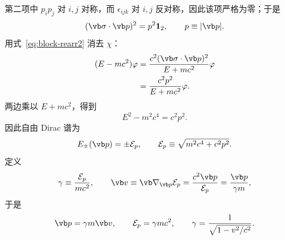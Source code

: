 第二项中 $p_ip_j$ 对 $i,j$ 对称，而 $\epsilon_{ijk}$ 对 $i,j$ 反对称，因此该项严格为零；于是
\begin{equation}
 (\vb\sigma\cdot\vb p)^2=p^2\mathbf 1_2,
 \qquad p\equiv|\vb p|.
 \label{eq:sigmap-square}
\end{equation}
用式~\cref{eq:block-rearr2} 消去 $\chi$：
\begin{align}
 (E-mc^2)\varphi
 &=\frac{c^2(\vb\sigma\cdot\vb p)^2}{E+mc^2}\varphi\\
 &=\frac{c^2p^2}{E+mc^2}\varphi.
\end{align}
两边乘以 $E+mc^2$，得到
\begin{equation}
 E^2-m^2c^4=c^2p^2.
\end{equation}
因此自由 Dirac 谱为
\begin{equation}
 {E_\pm(\vb p)=\pm \mathcal E_p,\qquad
 \mathcal E_p\equiv\sqrt{m^2c^4+c^2p^2}.}
 \label{eq:dispersion}
\end{equation}
定义
\begin{equation}
 \gamma\equiv\frac{\mathcal E_p}{mc^2},
 \qquad
 \vb v\equiv\vb\nabla_{\vb p}\mathcal E_p
 =\frac{c^2\vb p}{\mathcal E_p}
 =\frac{\vb p}{\gamma m},
 \label{eq:relrelations-vector}
\end{equation}
于是
\begin{equation}
 \vb p=\gamma m\vb v,
 \qquad
 \mathcal E_p=\gamma mc^2,
 \qquad
 \gamma=\frac{1}{\sqrt{1-v^2/c^2}}.
 \label{eq:relrelations}
\end{equation}

